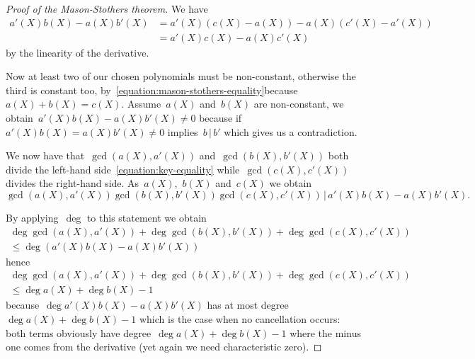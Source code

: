 \begin{proof}[Proof of the Mason-Stothers theorem]
  We have
  \begin{equation}
    \label{equation:key-equality}
    \begin{aligned}
      a'(X)b(X)-a(X)b'(X)&=a'(X)\left( c(X)-a(X) \right)-a(X)\left( c'(X)-a'(X) \right) \\
      &=a'(X)c(X)-a(X)c'(X)
    \end{aligned}
  \end{equation}
  by the linearity of the derivative.

  Now at least two of our chosen polynomials must be non-constant, otherwise the third is constant too, \iftex by~\eqref{equation:mason-stothers-equality}\fi\ifblog because~$a(X)+b(X)=c(X)$\fi. Assume~$a(X)$ and~$b(X)$ are non-constant, we obtain~$a'(X)b(X)-a(X)b'(X)\neq 0$ because if~$a'(X)b(X)=a(X)b'(X)\neq 0$ implies~$b\,|\,b'$ which gives us a contradiction.

  We now have that~$\gcd(a(X),a'(X))$ and~$\gcd(b(X),b'(X))$ both divide the left-hand side~\eqref{equation:key-equality} while~$\gcd(c(X),c'(X))$ divides the right-hand side. As~$a(X)$,~$b(X)$ and~$c(X)$ we obtain
  \begin{equation}
    \gcd\left( a(X),a'(X) \right)\gcd\left( b(X),b'(X) \right)\gcd\left( c(X),c'(X) \right)\,|\,a'(X)b(X)-a(X)b'(X).
  \end{equation}

  By applying~$\deg$ to this statement we obtain
  \begin{equation}
    \begin{gathered}
      \deg\gcd\left( a(X),a'(X) \right)+\deg\gcd\left( b(X),b'(X) \right)+\deg\gcd\left( c(X),c'(X) \right) \\
      \leq\deg\left( a'(X)b(X)-a(X)b'(X) \right)
    \end{gathered}
  \end{equation}
  hence
  \begin{equation}
    \label{equation:gcd-inequality}
    \begin{gathered}
      \deg\gcd\left( a(X),a'(X) \right)+\deg\gcd\left( b(X),b'(X) \right)+\deg\gcd\left( c(X),c'(X) \right) \\
      \leq\deg a(X)+\deg b(X)-1
    \end{gathered}
  \end{equation}
  because~$\deg a'(X)b(X)-a(X)b'(X)$ has at most degree~$\deg a(X)+\deg b(X)-1$ which is the case when no cancellation occurs: both terms obviously have degree~$\deg a(X)+\deg b(X)-1$ where the minus one comes from the derivative (yet again we need characteristic zero).


\end{proof}
